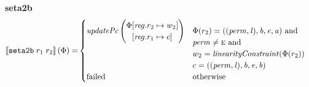 \documentclass[a4paper]{article}
\newcommand{\sem}[1]{\left\llbracket #1 \right\rrbracket}
\newcommand{\tand}{\text{ and }}
\newcommand{\totherwise}{\text{otherwise }}
\newcommand{\targetcolor}[1]{\color{black}}
\newcommand{\trg}[1]{{\targetcolor{} #1}}
\newcommand{\zinstr}[1]{\texttt{#1}}
\newcommand{\twoinstr}[3]{
  \ifthenelse{\equal{#2#3}{}}
  {\zinstr{#1}}
  {\zinstr{#1} \; #2 \; #3}
}
\newcommand{\tsetatob}[2]{\twoinstr{\trg{seta2b}}{#1}{#2}}
\newcommand{\update}[2]{[#1 \mapsto #2]}
\newcommand{\updReg}[2]{\update{\reg.#1}{#2}}
\newcommand{\perm}{\var{perm}}
\newcommand{\lin}{\var{l}}
\newcommand{\failed}{\mathrm{failed}}
\newcommand{\var}[1]{\mathit{#1}}
\newcommand{\reg}{\var{reg}}
\newcommand{\baddr}{\var{b}}
\newcommand{\eaddr}{\var{e}}
\newcommand{\aaddr}{\var{a}}
\newcommand{\plainperm}[1]{\textsc{#1}}
\newcommand{\enter}{\plainperm{e}}
\newcommand{\plainfun}[2]{
  \ifthenelse{\equal{#2}{}}
  {\mathit{#1}}
  {\mathit{#1}(#2)}
}
\newcommand{\updPcAddr}[1]{\plainfun{updatePc}{#1}}
\newcommand{\linCons}[1]{\plainfun{linearityConstraint}{#1}}
\begin{document}
\noindent\textbf{seta2b}\\
\begin{align*}
  \sem{\tsetatob{r_1}{r_2}}(\Phi) = & 
                                \begin{cases}
                                  \updPcAddr{}\left(
                                    \arraycolsep=0pt
                                    \begin{array}{rl}
                                    \Phi&\updReg{r_2}{w_2}\\
                                        &\updReg{r_1}{c}
                                    \end{array} \right)
&
                                    \arraycolsep=0pt
                                    \begin{array}[t]{l}
                                      \Phi(r_2) = ((\perm,\lin),\baddr,\eaddr,\aaddr) \tand \\
                                      \perm \neq \enter \tand \\
                                      w_2 = \linCons{\Phi(r_2)}\\
                                      c = ((\perm,\lin),\baddr,\eaddr,\baddr)
                                    \end{array} \\
                                    \failed & \totherwise
                                \end{cases}
\end{align*}
\end{document}
